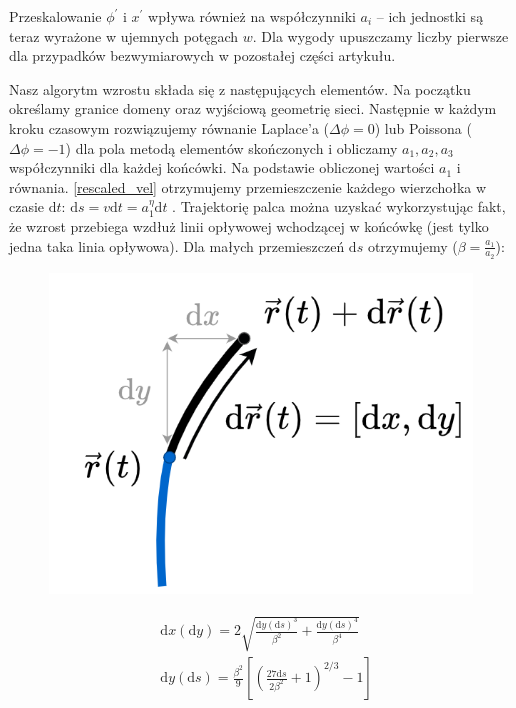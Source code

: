 \documentclass[]{pracamgr}
\begin{document}
      Przeskalowanie $\phi^\prime$ i $x^\prime$ wpływa również na współczynniki $a_i$ -- ich jednostki są teraz wyrażone w ujemnych potęgach $w$. Dla wygody upuszczamy liczby pierwsze dla przypadków bezwymiarowych w pozostałej części artykułu.

      Nasz algorytm wzrostu składa się z następujących elementów. Na początku określamy granice domeny oraz wyjściową geometrię sieci. Następnie w każdym kroku czasowym rozwiązujemy równanie Laplace'a ($\Delta \phi = 0$) lub Poissona ($\Delta \phi = -1$) dla pola metodą elementów skończonych i obliczamy $a_1 , a_2, a_3$ współczynniki dla każdej końcówki. Na podstawie obliczonej wartości $a_1$ i równania. \eqref{rescaled_vel} otrzymujemy przemieszczenie każdego wierzchołka w czasie $\textrm{d}t$: $\textrm{d}s = v \textrm{d}t = a_1^\eta \textrm{d}t$ . Trajektorię palca można uzyskać wykorzystując fakt, że wzrost przebiega wzdłuż linii opływowej wchodzącej w końcówkę (jest tylko jedna taka linia opływowa). Dla małych przemieszczeń $\textrm{d}s$ otrzymujemy ($\beta = \frac{a_1}{a_2}$):

      \begin{figure}[h]
        \centering
        \begin{minipage}{0.25\textwidth}
          \centering
          \includegraphics[width=\textwidth, trim={0 0 285 0},clip]{figs/growth.png}
        \end{minipage}
        \hspace{-40pt}
        \begin{minipage}{0.6\textwidth}
          \begin{align}
            \label{x_growth}
            & \textrm{d}x(\textrm{d}y)=2\sqrt{\frac{\textrm{d}y(\textrm{d}s)^3}{\beta^2}+\frac{\textrm{d}y(\textrm{d}s)^4}{\beta^4}}\\
            \label{y_growth}
            & \textrm{d}y(\textrm{d}s)=\frac{\beta^2}{9}\left[\left(\frac{27 \textrm{d}s}{2 \beta ^2}+1\right)^{2/3} - 1 \right]
          \end{align}
        \end{minipage}
        \vspace{0pt}
      \end{figure}
\end{document}
